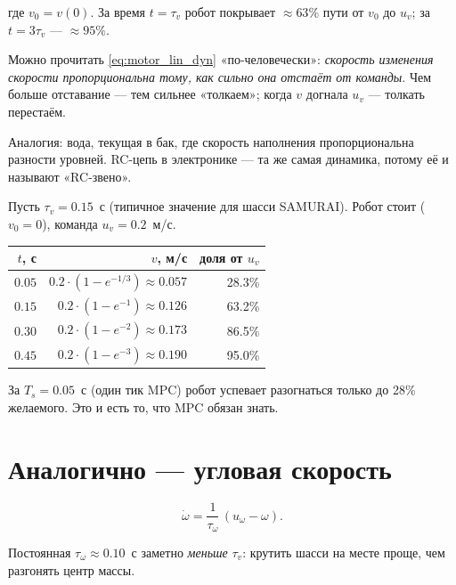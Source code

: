 где $v_0 = v(0)$. За время $t = \tau_v$ робот покрывает $\approx 63\%$
пути от $v_0$ до $u_v$; за $t = 3\tau_v$ --- $\approx 95\%$.

\begin{ideabox}
Можно прочитать \eqref{eq:motor_lin_dyn} «по-человечески»: \emph{скорость
изменения скорости пропорциональна тому, как сильно она отстаёт от
команды}. Чем больше отставание --- тем сильнее «толкаем»; когда $v$
догнала $u_v$ --- толкать перестаём.

Аналогия: вода, текущая в бак, где скорость наполнения пропорциональна
разности уровней. RC-цепь в электронике --- та же самая динамика, потому
её и называют «RC-звено».
\end{ideabox}

\begin{examplebox}[title={Численный пример}]
Пусть $\tau_v = 0.15$~с (типичное значение для шасси SAMURAI).
Робот стоит ($v_0 = 0$), команда $u_v = 0.2$~м/с.

\begin{tabular}{rrr}
\toprule
$t$, с & $v$, м/с & доля от $u_v$\\
\midrule
$0.05$ & $0.2 \cdot (1 - e^{-1/3}) \approx 0.057$ & 28.3\%\\
$0.15$ & $0.2 \cdot (1 - e^{-1}) \approx 0.126$ & 63.2\%\\
$0.30$ & $0.2 \cdot (1 - e^{-2}) \approx 0.173$ & 86.5\%\\
$0.45$ & $0.2 \cdot (1 - e^{-3}) \approx 0.190$ & 95.0\%\\
\bottomrule
\end{tabular}

За $T_s = 0.05$~с (один тик MPC) робот успевает разогнаться только
до 28\% желаемого. Это и есть то, что MPC обязан знать.
\end{examplebox}

\section{Аналогично --- угловая скорость}

\begin{formulabox}[title={Динамика угловой скорости}]
\begin{equation}
  \dot{\omega} = \frac{1}{\tau_\omega}\,(u_\omega - \omega).
  \label{eq:motor_ang_dyn}
\end{equation}
\end{formulabox}

Постоянная $\tau_\omega \approx 0.10$~с заметно \emph{меньше} $\tau_v$:
крутить шасси на месте проще, чем разгонять центр массы.

